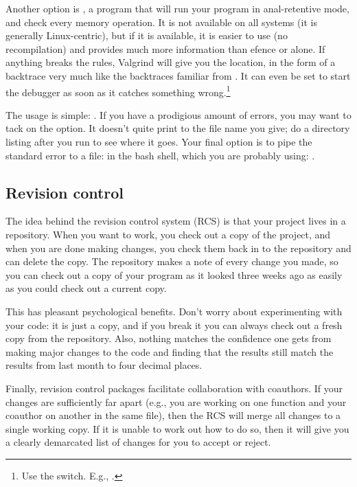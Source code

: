 Another option is , a program that will
run your program in anal-retentive mode, and check every memory operation. 
It is not available on all systems (it is generally Linux-centric), but
if it is available, it is easier to use (no recompilation) and provides much more information than efence or
 alone. If anything breaks the rules, Valgrind will give you
the location, in the form of a backtrace very much like the backtraces
familiar from . It can even be set to start the debugger as soon
as it catches something wrong.\footnote{Use the  switch.
E.g., .}

The usage is simple: . If you have a prodigious amount
of errors, you may want to tack on the  option. It doesn't
quite print to the file name you give; do a directory listing after you run  to see where it goes.  Your final option is to pipe the standard
error to a file: in the bash shell, which you are probably using: .

\subsection{Revision control}  \label{valgrind}
The idea behind the revision control system (RCS) is that your project
lives in a repository. When you want to work, you check out
a copy of the project, and when you are done making changes, you check
them back in to the repository and can delete the copy.  The repository
makes a note of every change you made, so you can check out a copy of
your program as it looked three weeks ago as easily as you could check
out a current copy.

This has pleasant psychological benefits. Don't worry about experimenting
with your code: it is just a copy, and if you break it you can always check
out a fresh copy from the repository. Also, nothing matches the confidence
one gets from making major changes to the code and finding that the
results still match the results from last month to four decimal places.

Finally, revision control packages facilitate collaboration with
coauthors. If your changes are sufficiently far apart (e.g., you are
working on one function and your coauthor on another in the same file),
then the RCS will merge all changes to a single working copy. If
it is unable to work out how to do so, then it will give you a
clearly demarcated list of changes for you to accept or reject.

